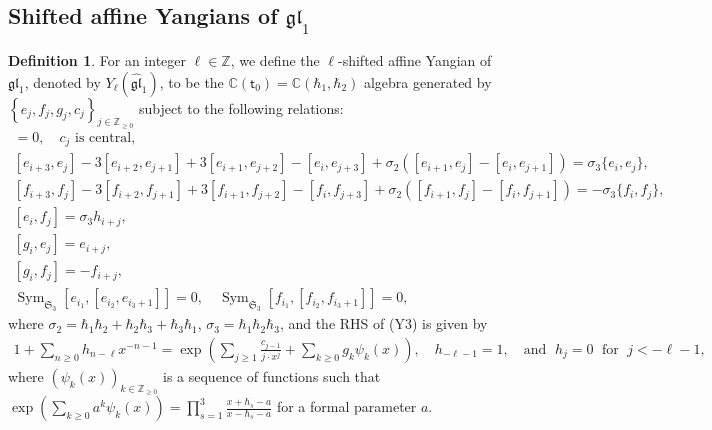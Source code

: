 \documentclass[10pt]{amsart}
\theoremstyle{definition}
\newtheorem{Definition}[Theorem]{Definition}
\numberwithin{equation}{section}
\newcommand{\bC}{\mathbb{C}}
\newcommand{\bZ}{\mathbb{Z}}
\newcommand{\sT}{\mathsf{T}}
\newcommand{\sW}{\mathsf{W}}
\newcommand{\Sym}{\operatorname{Sym}}
\begin{document}
\subsection{Shifted affine Yangians of \texorpdfstring{$\mathfrak{gl}_1$}{gl(1)}}\label{sec affine yangian}


\begin{Definition}\label{def of shifted affine Y(gl_1)}
For an integer $\ell\in \bZ$, we define the $\ell$-shifted affine Yangian of $\mathfrak{gl}_1$, denoted by $Y_\ell(\widehat{\mathfrak{gl}}_1)$, to be the $\bC(\mathsf t_0)=\bC(\hbar_1,\hbar_2)$ algebra generated by $\left\{e_j,f_j,g_j,c_j\right\}_{j\in \mathbb Z_{\geqslant 0}}$ subject to the following relations:
\begin{gather*}
[g_i,g_j]=0,\quad c_j\text{ is central},\tag{Y0}\\
[e_{i+3}, e_j]-3[e_{i+2}, e_{j+1}] + 3[e_{i+1}, e_{j+2}]-[e_i, e_{j+3}] + \sigma_2([e_{i+1}, e_j]-[e_i, e_{j+1}]) = \sigma_3\{e_i, e_j\},\tag{Y1}\\
[f_{i+3}, f_j]-3[f_{i+2}, f_{j+1}] + 3[f_{i+1}, f_{j+2}]-[f_i, f_{j+3}] + \sigma_2([f_{i+1}, f_j]-[f_i, f_{j+1}]) = -\sigma_3\{f_i, f_j\},\tag{Y2}\\
[e_i,f_j]=\sigma_3 h_{i+j},\tag{Y3}\\
[g_i, e_j]= e_{i+j},\tag{Y4}\\
[g_i, f_j]= -f_{i+j},\tag{Y5}\\
\Sym_{\mathfrak{S}_3}[e_{i_1},[e_{i_2},e_{i_3+1}]]=0,\quad \Sym_{\mathfrak{S}_3}[f_{i_1},[f_{i_2},f_{i_3+1}]]=0,\tag{Y6}
\end{gather*}
where $\sigma_2=\hbar_1\hbar_2+\hbar_2\hbar_3+\hbar_3\hbar_1$, $\sigma_3=\hbar_1\hbar_2\hbar_3$, and the RHS of (Y3) is given by
\begin{align*}
1+\sum_{n\geqslant 0}h_{n-\ell}x^{-n-1}=\exp\left(\sum_{j\geqslant 1}\frac{c_{j-1}}{j\cdot x^j}+\sum_{k\geqslant 0}g_{k}\psi_k(x)\right),\quad h_{-\ell-1}=1,\quad \text{and }\;h_j=0\;\text{ for }\;j<-\ell-1,
\end{align*} 
where $(\psi_k(x))_{k\in \bZ_{\geqslant 0}}$ is a sequence of functions such that $\exp\left(\sum_{k\geqslant 0} a^k\psi_k(x)\right)=\prod_{s=1}^3\frac{x+\hbar_s-a}{x-\hbar_s-a}$ for a formal parameter $a$.


\end{Definition}
\end{document}
